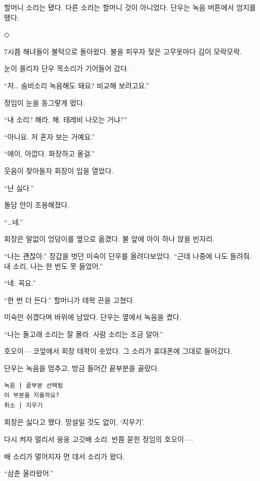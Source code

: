 \documentclass[
  korean,
  letterpaper,
  twoside,
  open=any,
  fontsize=12.5pt,
  headings=small]{scrbook}
\newcommand{\logfont}{\linespread{1}\fontsize{10.8}{15.2}\selectfont}
\begin{document}
할머니 소리는 됐다. 다른
소리는 할머니 것이 아니었다.
단우는 녹음 버튼에서 엄지를
뗐다.

\begin{center}◇\end{center}\nopagebreak

7시쯤 해녀들이 불턱으로
돌아왔다. 불을 피우자 젖은
고무옷마다 김이 모락모락.

눈이 쏠리자 단우 목소리가
기어들어 갔다.

``저\ldots{} 숨비소리 녹음해도
돼요? 비교해 보려고요.''

정임이 눈을 동그랗게 떴다.

``내 소리? 해라, 해. 테레비
나오는 거냐?''

``아니요. 저 혼자 보는
거예요.''

``에이, 아깝다. 화장하고
올걸.''

웃음이 잦아들자 회장이 입을
열었다.

``난 싫다.''

돌담 안이 조용해졌다.

``\ldots 네.''

회장은 말없이 엉덩이를 옆으로
옮겼다. 불 앞에 아이 하나 앉을
빈자리.

``나는 괜찮아.'' 장갑을 벗던
미숙이 단우를 올려다보았다.
``근데 나중에 나도 들려줘. 내
소리, 나는 한 번도 못
들었어.''

``네. 꼭요.''

``한 번 더 든다.'' 할머니가
테왁 끈을 고쳤다.

미숙만 쉬겠다며 바위에 남았다.
단우는 옆에서 녹음을 켰다.

``나는 돌고래 소리는 잘 몰라.
사람 소리는 조금 알아.''

호오이--- 코앞에서 회장 테왁이
솟았다. 그 소리가 휴대폰에
그대로 들어갔다.

단우는 녹음을 멈추고, 방금
들어간 끝부분을 골랐다.

\begin{Verbatim}[samepage=true,frame=single,framesep=2.5mm,rulecolor=\color{gray},formatcom=\logfont]
녹음 | 끝부분 선택됨
이 부분을 지울까요?
취소 | 지우기
\end{Verbatim}

회장은 싫다고 했다. 망설일
것도 없이, `지우기'.

다시 켜자 멀리서 웅웅 고깃배
소리. 반쯤 묻힌 정임의
호오이---.

배 소리가 멀어지자 먼 데서
소리가 왔다.

``삼춘 올라왔어.''
\end{document}
